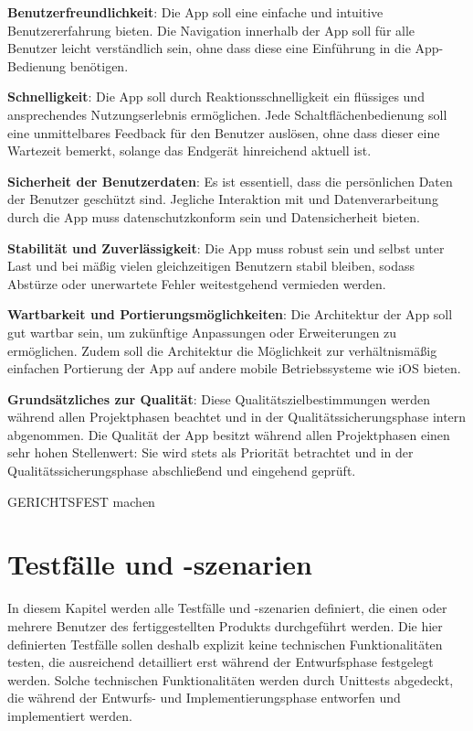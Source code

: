 \documentclass[oneside, ngerman]{sdqtechreport}
\begin{document}
\textbf{Benutzerfreundlichkeit}: Die App soll eine einfache und intuitive Benutzererfahrung bieten. Die Navigation innerhalb der App soll für alle Benutzer leicht verständlich sein, ohne dass diese eine Einführung in die App-Bedienung benötigen.

\textbf{Schnelligkeit}: Die App soll durch Reaktionsschnelligkeit ein flüssiges und ansprechendes Nutzungserlebnis ermöglichen. Jede Schaltflächenbedienung soll eine unmittelbares Feedback für den Benutzer auslösen, ohne dass dieser eine Wartezeit bemerkt, solange das Endgerät hinreichend aktuell ist.

\textbf{Sicherheit der Benutzerdaten}: Es ist essentiell, dass die persönlichen Daten der Benutzer geschützt sind. Jegliche Interaktion mit und Datenverarbeitung durch die App muss datenschutzkonform sein und Datensicherheit bieten.

\textbf{Stabilität und Zuverlässigkeit}: Die App muss robust sein und selbst unter Last und bei mäßig vielen gleichzeitigen Benutzern stabil bleiben, sodass Abstürze oder unerwartete Fehler weitestgehend vermieden werden.

\textbf{Wartbarkeit und Portierungsmöglichkeiten}: Die Architektur der App soll gut wartbar sein, um zukünftige Anpassungen oder Erweiterungen zu ermöglichen. Zudem soll die Architektur die Möglichkeit zur verhältnismäßig einfachen Portierung der App auf andere mobile Betriebssysteme wie iOS bieten. 

\textbf{Grundsätzliches zur Qualität}: Diese Qualitätszielbestimmungen werden während allen Projektphasen beachtet und in der Qualitätssicherungsphase intern abgenommen. Die Qualität der App besitzt während allen Projektphasen einen sehr hohen Stellenwert: Sie wird stets als Priorität betrachtet und in der Qualitätssicherungsphase abschließend und eingehend geprüft.

GERICHTSFEST machen



\chapter{Testfälle und -szenarien}
\label{chap:Tests}

In diesem Kapitel werden alle Testfälle und -szenarien definiert, die einen oder mehrere Benutzer des fertiggestellten Produkts durchgeführt werden. Die hier definierten Testfälle sollen deshalb explizit keine technischen Funktionalitäten testen, die ausreichend detailliert erst während der Entwurfsphase festgelegt werden. Solche technischen Funktionalitäten werden durch Unittests abgedeckt, die während der Entwurfs- und Implementierungsphase entworfen und implementiert werden.
\end{document}
